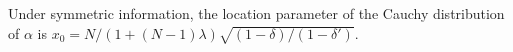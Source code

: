 \documentclass[12pt]{article}
\theoremstyle{definition}
\theoremstyle{definition}
\begin{document}
Under symmetric information, the location parameter of the Cauchy distribution of $\alpha$
is
$x_0 = N/(1+(N-1)\lambda)  \sqrt{(1-\delta)/(1-\delta')}$. 
\end{document}
